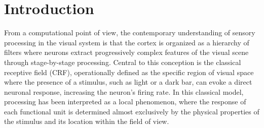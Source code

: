 \section{Introduction}
\label{sec:intro}

From a computational point of view, the contemporary understanding of sensory processing in the visual system is that the cortex is organized as a hierarchy of filters where neurons extract progressively complex features of the visual scene through stage-by-stage processing. Central to this conception is the classical receptive field (CRF), operationally defined as the specific region of visual space where the presence of a stimulus, such as light or a dark bar, can evoke a direct neuronal response, increasing the neuron's firing rate. In this classical model, processing has been interpreted as a local phenomenon, where the response of each functional unit is determined almost exclusively by the physical properties of the stimulus and its location within the field of view.


